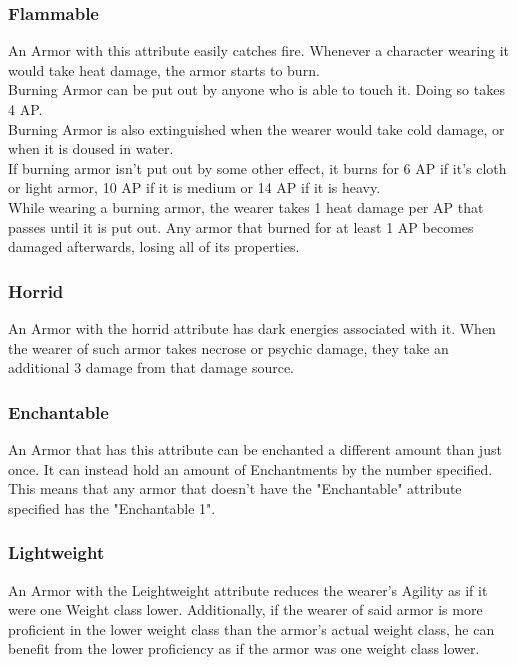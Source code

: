 \subsubsection{Flammable}\label{armor:flammable}
An Armor with this attribute easily catches fire.
Whenever a character wearing it would take heat damage, the armor starts to burn.\\
Burning Armor can be put out by anyone who is able to touch it.
Doing so takes 4 AP.\\
Burning Armor is also extinguished when the wearer would take cold damage, or when it is doused in water.\\
If burning armor isn't put out by some other effect, it burns for 6 AP if it's cloth or light armor, 10 AP if it is medium or 14 AP if it is heavy.\\
While wearing a burning armor, the wearer takes 1 heat damage per AP that passes until it is put out.
Any armor that burned for at least 1 AP becomes damaged afterwards, losing all of its properties.

\subsubsection{Horrid}\label{armor:horrid}
An Armor with the horrid attribute has dark energies associated with it.
When the wearer of such armor takes necrose or psychic damage, they take an additional 3 damage from that damage source.

\subsubsection{Enchantable}\label{armor:enchantable}
An Armor that has this attribute can be enchanted a different amount than just once.
It can instead hold an amount of Enchantments by the number specified.
This means that any armor that doesn't have the "Enchantable" attribute specified has the "Enchantable 1".

\subsubsection{Lightweight}\label{armor:lightweight}
An Armor with the Leightweight attribute reduces the wearer's Agility as if it were one Weight class lower.
Additionally, if the wearer of said armor is more proficient in the lower weight class than the armor's actual weight class, he can benefit from the lower proficiency as if the armor was one weight class lower.

